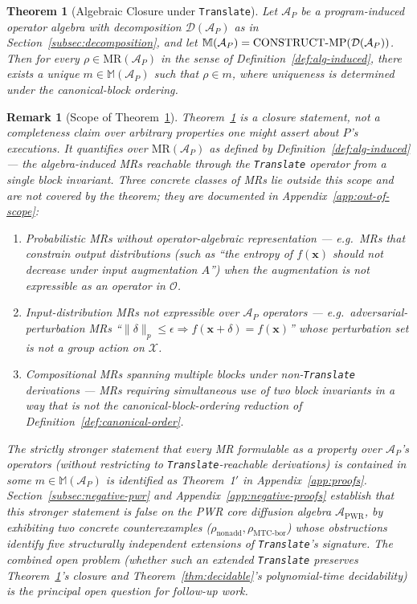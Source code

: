 \documentclass[acmsmall, screen]{acmart}
\newtheorem{theorem}{Theorem}
\newtheorem{remark}{Remark}
\begin{document}
\begin{theorem}[Algebraic Closure under \texttt{Translate}]
\label{thm:closure}
Let $\mathcal{A}_P$ be a program-induced operator algebra with decomposition $\mathcal{D}(\mathcal{A}_P)$ as in Section~\ref{subsec:decomposition}, and let $\mathbb{M}(\mathcal{A}_P) = \mathrm{CONSTRUCT\textnormal{-}MP}(\mathcal{D}(\mathcal{A}_P))$. Then for every $\rho \in \mathrm{MR}(\mathcal{A}_P)$ in the sense of Definition~\ref{def:alg-induced}, there exists a unique $m \in \mathbb{M}(\mathcal{A}_P)$ such that $\rho \in m$, where uniqueness is determined under the canonical-block ordering.
\end{theorem}

\begin{remark}[Scope of Theorem~\ref{thm:closure}]
\label{rem:scope}
Theorem~\ref{thm:closure} is a closure statement, not a completeness claim over arbitrary properties one might assert about $P$'s executions. It quantifies over $\mathrm{MR}(\mathcal{A}_P)$ as defined by Definition~\ref{def:alg-induced} --- the algebra-induced MRs reachable through the \texttt{Translate} operator from a single block invariant. Three concrete classes of MRs lie outside this scope and are not covered by the theorem; they are documented in Appendix~\ref{app:out-of-scope}:
\begin{enumerate}
    \item \emph{Probabilistic MRs without operator-algebraic representation} --- e.g.\ MRs that constrain output \emph{distributions} (such as ``the entropy of $f(\mathbf{x})$ should not decrease under input augmentation $A$'') when the augmentation is not expressible as an operator in $\mathcal{O}$.
    \item \emph{Input-distribution MRs} not expressible over $\mathcal{A}_P$ operators --- e.g.\ adversarial-perturbation MRs ``$\| \delta\|_p \le \epsilon \Rightarrow f(\mathbf{x}+\delta) = f(\mathbf{x})$'' whose perturbation set is not a group action on $\mathcal{X}$.
    \item \emph{Compositional MRs spanning multiple blocks under non-\texttt{Translate} derivations} --- MRs requiring simultaneous use of two block invariants in a way that is not the canonical-block-ordering reduction of Definition~\ref{def:canonical-order}.
\end{enumerate}
The strictly stronger statement that every MR formulable as a property over $\mathcal{A}_P$'s operators (without restricting to \texttt{Translate}-reachable derivations) is contained in some $m \in \mathbb{M}(\mathcal{A}_P)$ is identified as Theorem~1$'$ in Appendix~\ref{app:proofs}. Section~\ref{subsec:negative-pwr} and Appendix~\ref{app:negative-proofs} establish that this stronger statement is false on the PWR core diffusion algebra $\mathcal{A}_{\mathrm{PWR}}$, by exhibiting two concrete counterexamples ($\rho_{\mathrm{nonadd}}, \rho_{\mathrm{MTC\text{-}bor}}$) whose obstructions identify five structurally independent extensions of \texttt{Translate}'s signature. The combined open problem (whether such an extended \texttt{Translate} preserves Theorem~\ref{thm:closure}'s closure and Theorem~\ref{thm:decidable}'s polynomial-time decidability) is the principal open question for follow-up work.
\end{remark}
\end{document}
